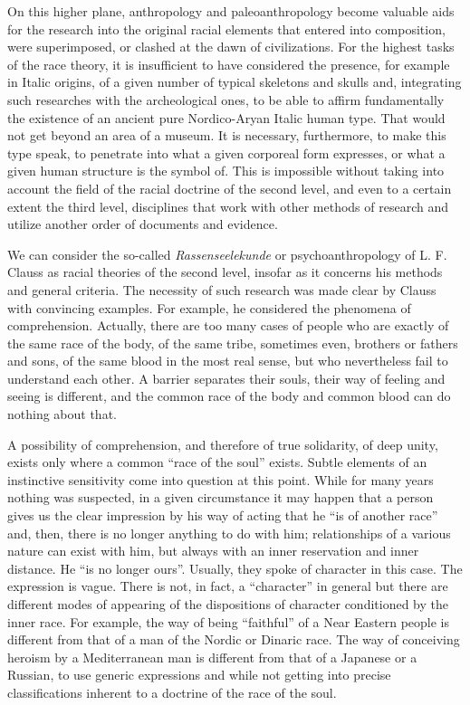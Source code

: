 On this higher plane, anthropology and paleoanthropology become valuable aids for the research into the original racial elements that entered into composition, were superimposed, or clashed at the dawn of civilizations. For the highest tasks of the race theory, it is insufficient to have considered the presence, for example in Italic origins, of a given number of typical skeletons and skulls and, integrating such researches with the archeological ones, to be able to affirm fundamentally the existence of an ancient pure Nordico-Aryan Italic human type. That would not get beyond an area of a museum. It is necessary, furthermore, to make this type speak, to penetrate into what a given corporeal form expresses, or what a given human structure is the symbol of. This is impossible without taking into account the field of the racial doctrine of the second level, and even to a certain extent the third level, disciplines that work with other methods of research and utilize another order of documents and evidence.

We can consider the so-called \emph{Rassenseelekunde} or psychoanthropology of L. F. Clauss as racial theories of the second level, insofar as it concerns his methods and general criteria. The necessity of such research was made clear by Clauss with convincing examples. For example, he considered the phenomena of comprehension. Actually, there are too many cases of people who are exactly of the same race of the body, of the same tribe, sometimes even, brothers or fathers and sons, of the same blood in the most real sense, but who nevertheless fail to understand each other. A barrier separates their souls, their way of feeling and seeing is different, and the common race of the body and common blood can do nothing about that.

A possibility of comprehension, and therefore of true solidarity, of deep unity, exists only where a common ``race of the soul'' exists. Subtle elements of an instinctive sensitivity come into question at this point. While for many years nothing was suspected, in a given circumstance it may happen that a person gives us the clear impression by his way of acting that he ``is of another race'' and, then, there is no longer anything to do with him; relationships of a various nature can exist with him, but always with an inner reservation and inner distance. He ``is no longer ours''. Usually, they spoke of character in this case. The expression is vague. There is not, in fact, a ``character'' in general but there are different modes of appearing of the dispositions of character conditioned by the inner race. For example, the way of being ``faithful'' of a Near Eastern people is different from that of a man of the Nordic or Dinaric race. The way of conceiving heroism by a Mediterranean man is different from that of a Japanese or a Russian, to use generic expressions and while not getting into precise classifications inherent to a doctrine of the race of the soul.

